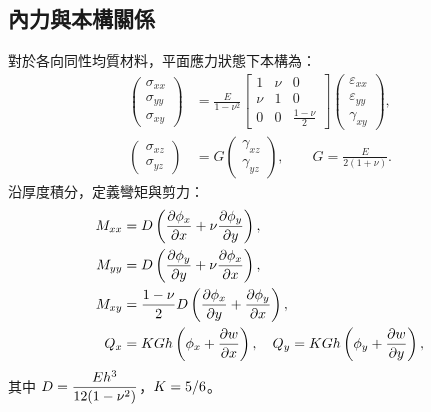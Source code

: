 \subsection{內力與本構關係}
對於各向同性均質材料，平面應力狀態下本構為：
\begin{align}
\begin{pmatrix} \sigma_{xx} \\ \sigma_{yy} \\ \sigma_{xy} \end{pmatrix}
&= \frac{E}{1-\nu^2}
\begin{bmatrix} 1 & \nu & 0 \\ \nu & 1 & 0 \\ 0 & 0 & \frac{1-\nu}{2} \end{bmatrix}
\begin{pmatrix} \varepsilon_{xx} \\ \varepsilon_{yy} \\ \gamma_{xy} \end{pmatrix},\\
\begin{pmatrix} \sigma_{xz} \\ \sigma_{yz} \end{pmatrix}
&= G \begin{pmatrix} \gamma_{xz} \\ \gamma_{yz} \end{pmatrix},\qquad G = \frac{E}{2(1+\nu)}.
\end{align}
沿厚度積分，定義彎矩與剪力：
\begin{align}
M_{xx} &= D\left(\pdv{\phi_x}{x} + \nu\pdv{\phi_y}{y}\right), \notag\\
M_{yy} &= D\left(\pdv{\phi_y}{y} + \nu\pdv{\phi_x}{x}\right), \notag\\
M_{xy} &= \frac{1-\nu}{2}D\left(\pdv{\phi_x}{y}+\pdv{\phi_y}{x}\right),\\
Q_x &= K G h \left(\phi_x + \pdv{w}{x}\right),\quad
Q_y = K G h \left(\phi_y + \pdv{w}{y}\right),
\end{align}
其中 \(D = \dfrac{E h^3}{12(1-\nu^2)}\)，\(K = 5/6\)。

